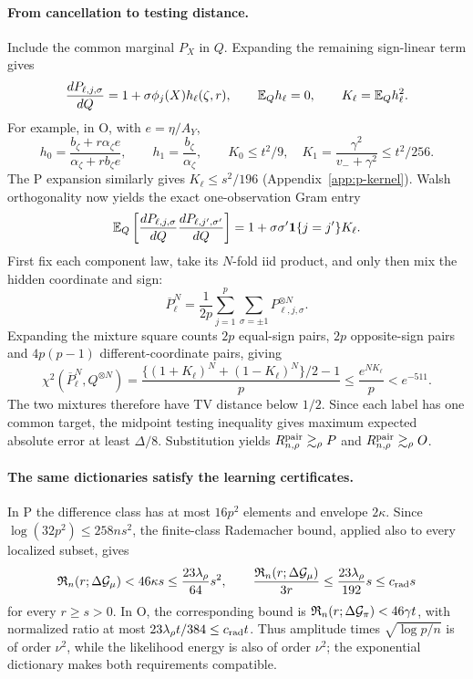\documentclass{article}
\theoremstyle{definition}
\theoremstyle{remark}
\begin{document}
\paragraph{From cancellation to testing distance.}
Include the common marginal \(P_X\) in \(Q\). Expanding the remaining sign-linear term gives
\[
 \frac{dP_{\ell,j,\sigma}}{dQ}=1+\sigma\phi_j(X)h_\ell(\zeta,r),\qquad
 \mathbb E_Qh_\ell=0,\qquad K_\ell=\mathbb E_Qh_\ell^2.
\]
For example, in O, with \(e=\eta/A_Y\),
\[
 h_0=\frac{b_\zeta+r\alpha_\zeta e}{\alpha_\zeta+rb_\zeta e},\qquad
 h_1=\frac{b_\zeta}{\alpha_\zeta},\qquad
 K_0\le t^2/9,\quad K_1=\frac{\gamma^2}{v_-+\gamma^2}\le t^2/256.
\]
The P expansion similarly gives \(K_\ell\le s^2/196\) (Appendix~\ref{app:p-kernel}). Walsh orthogonality now yields the exact one-observation Gram entry
\[
 \mathbb E_Q\left[\frac{dP_{\ell,j,\sigma}}{dQ}
              \frac{dP_{\ell,j',\sigma'}}{dQ}\right]
 =1+\sigma\sigma'\mathbf 1\{j=j'\}K_\ell.
\]
First fix each component law, take its \(N\)-fold iid product, and only then mix the hidden coordinate and sign:
\[
 \overline P_\ell^N=\frac1{2p}\sum_{j=1}^p\sum_{\sigma=\pm1}P_{\ell,j,\sigma}^{\otimes N}.
\]
Expanding the mixture square counts \(2p\) equal-sign pairs, \(2p\) opposite-sign pairs and \(4p(p-1)\) different-coordinate pairs, giving
\begin{equation}
 \chi^2(\overline P_\ell^N,Q^{\otimes N})
 =\frac{\{(1+K_\ell)^N+(1-K_\ell)^N\}/2-1}{p}
 \le\frac{e^{NK_\ell}}p<e^{-511}.
 \label{eq:mixture-distance}
\end{equation}
The two mixtures therefore have TV distance below \(1/2\). Since each label has one common target, the midpoint testing inequality gives maximum expected absolute error at least \(\Delta/8\). Substitution yields \(R^{\mathrm{pair}}_{n,\rho}\gtrsim_\rho P\) and \(R^{\mathrm{pair}}_{n,\rho}\gtrsim_\rho O\).

\paragraph{The same dictionaries satisfy the learning certificates.}
In P the difference class has at most \(16p^2\) elements and envelope \(2\kappa\). Since \(\log(32p^2)\le258ns^2\), the finite-class Rademacher bound, applied also to every localized subset, gives
\[
 \mathfrak R_n(r;\Delta\mathcal G_\mu)<46\kappa s
 \le\frac{23\lambda_\rho}{64}s^2,
 \qquad \frac{\mathfrak R_n(r;\Delta\mathcal G_\mu)}{3r}
 \le\frac{23\lambda_\rho}{192}s\le c_{\rm rad}s
\]
for every \(r\ge s>0\). In O, the corresponding bound is
\(\mathfrak R_n(r;\Delta\mathcal G_\pi)<46\gamma t\), with normalized ratio at most \(23\lambda_\rho t/384\le c_{\rm rad}t\). Thus amplitude times \(\sqrt{\log p/n}\) is of order \(\nu^2\), while the likelihood energy is also of order \(\nu^2\); the exponential dictionary makes both requirements compatible.
\end{document}
